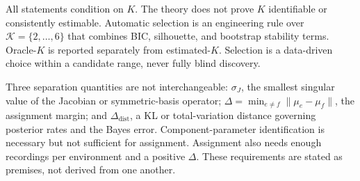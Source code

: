 All statements condition on \(K\). The theory does not prove \(K\)
identifiable or consistently estimable. Automatic selection is an
engineering rule over \(\mathcal K=\{2,\dots,6\}\) that combines BIC,
silhouette, and bootstrap stability terms. Oracle-\(K\) is reported
separately from estimated-\(K\). Selection is a data-driven choice
within a candidate range, never fully blind discovery.

Three separation quantities are not interchangeable: \(\sigma_J\), the
smallest singular value of the Jacobian or symmetric-basis operator;
\(\Delta=\min_{e\ne f}\|\mu_e-\mu_f\|\), the assignment margin; and
\(\Delta_{\mathrm{dist}}\), a KL or total-variation distance governing
posterior rates and the Bayes error. Component-parameter identification
is necessary but not sufficient for assignment. Assignment also needs
enough recordings per environment and a positive \(\Delta\). These
requirements are stated as premises, not derived from one another.
